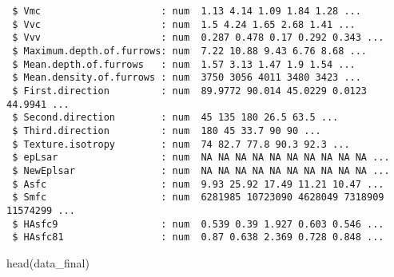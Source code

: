 \documentclass[
]{article}
\newenvironment{Shaded}{\begin{snugshade}}{\end{snugshade}}
\newcommand{\FunctionTok}[1]{\textcolor[rgb]{0.00,0.00,0.00}{#1}}
\newcommand{\NormalTok}[1]{#1}
\begin{document}
\begin{verbatim}
 $ Vmc                     : num  1.13 4.14 1.09 1.84 1.28 ...
 $ Vvc                     : num  1.5 4.24 1.65 2.68 1.41 ...
 $ Vvv                     : num  0.287 0.478 0.17 0.292 0.343 ...
 $ Maximum.depth.of.furrows: num  7.22 10.88 9.43 6.76 8.68 ...
 $ Mean.depth.of.furrows   : num  1.57 3.13 1.47 1.9 1.54 ...
 $ Mean.density.of.furrows : num  3750 3056 4011 3480 3423 ...
 $ First.direction         : num  89.9772 90.014 45.0229 0.0123 44.9941 ...
 $ Second.direction        : num  45 135 180 26.5 63.5 ...
 $ Third.direction         : num  180 45 33.7 90 90 ...
 $ Texture.isotropy        : num  74 82.7 77.8 90.3 92.3 ...
 $ epLsar                  : num  NA NA NA NA NA NA NA NA NA NA ...
 $ NewEplsar               : num  NA NA NA NA NA NA NA NA NA NA ...
 $ Asfc                    : num  9.93 25.92 17.49 11.21 10.47 ...
 $ Smfc                    : num  6281985 10723090 4628049 7318909 11574299 ...
 $ HAsfc9                  : num  0.539 0.39 1.927 0.603 0.546 ...
 $ HAsfc81                 : num  0.87 0.638 2.369 0.728 0.848 ...
\end{verbatim}

\begin{Shaded}
\begin{Highlighting}[]
\FunctionTok{head}\NormalTok{(data\_final)}
\end{Highlighting}
\end{Shaded}
\end{document}
